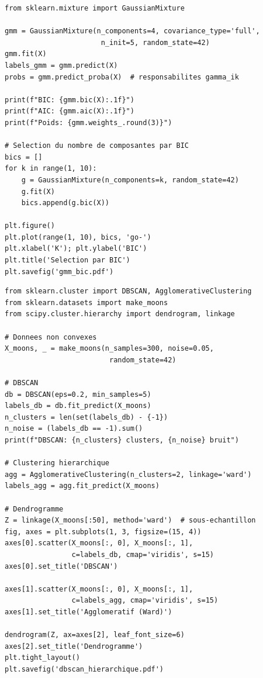 \begin{codeblock}[title=\textbf{GMM avec scikit-learn}]
\begin{verbatim}
from sklearn.mixture import GaussianMixture

gmm = GaussianMixture(n_components=4, covariance_type='full',
                       n_init=5, random_state=42)
gmm.fit(X)
labels_gmm = gmm.predict(X)
probs = gmm.predict_proba(X)  # responsabilites gamma_ik

print(f"BIC: {gmm.bic(X):.1f}")
print(f"AIC: {gmm.aic(X):.1f}")
print(f"Poids: {gmm.weights_.round(3)}")

# Selection du nombre de composantes par BIC
bics = []
for k in range(1, 10):
    g = GaussianMixture(n_components=k, random_state=42)
    g.fit(X)
    bics.append(g.bic(X))

plt.figure()
plt.plot(range(1, 10), bics, 'go-')
plt.xlabel('K'); plt.ylabel('BIC')
plt.title('Selection par BIC')
plt.savefig('gmm_bic.pdf')
\end{verbatim}
\end{codeblock}

\begin{codeblock}[title=\textbf{DBSCAN et clustering hi\'erarchique}]
\begin{verbatim}
from sklearn.cluster import DBSCAN, AgglomerativeClustering
from sklearn.datasets import make_moons
from scipy.cluster.hierarchy import dendrogram, linkage

# Donnees non convexes
X_moons, _ = make_moons(n_samples=300, noise=0.05,
                         random_state=42)

# DBSCAN
db = DBSCAN(eps=0.2, min_samples=5)
labels_db = db.fit_predict(X_moons)
n_clusters = len(set(labels_db) - {-1})
n_noise = (labels_db == -1).sum()
print(f"DBSCAN: {n_clusters} clusters, {n_noise} bruit")

# Clustering hierarchique
agg = AgglomerativeClustering(n_clusters=2, linkage='ward')
labels_agg = agg.fit_predict(X_moons)

# Dendrogramme
Z = linkage(X_moons[:50], method='ward')  # sous-echantillon
fig, axes = plt.subplots(1, 3, figsize=(15, 4))
axes[0].scatter(X_moons[:, 0], X_moons[:, 1],
                c=labels_db, cmap='viridis', s=15)
axes[0].set_title('DBSCAN')

axes[1].scatter(X_moons[:, 0], X_moons[:, 1],
                c=labels_agg, cmap='viridis', s=15)
axes[1].set_title('Agglomeratif (Ward)')

dendrogram(Z, ax=axes[2], leaf_font_size=6)
axes[2].set_title('Dendrogramme')
plt.tight_layout()
plt.savefig('dbscan_hierarchique.pdf')
\end{verbatim}
\end{codeblock}

